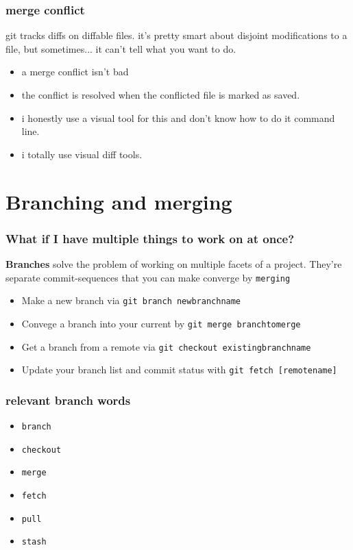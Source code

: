 \documentclass[14pt,aspectratio=1610]{beamer} %
\newcommand{\fframe}[2]{
   \begin{frame}
\frametitle{#1}
#2
\end{frame}
}
\begin{document}
\fframe{merge conflict}
{
	git tracks diffs on diffable files.  it's pretty smart about disjoint modifications to a file, but sometimes... it can't tell what you want to do.

		\begin{itemize}
	\item a merge conflict isn't bad
	\item the conflict is resolved when the conflicted file is marked as saved.  
	\item i honestly use a visual tool for this and don't know how to do it command line.  
	\item i totally use visual diff tools.  
\end{itemize}
}






\section{Branching and merging}

\fframe{What if I have multiple things to work on at once?}
{
	{\bf Branches} solve the problem of working on multiple facets of a project.  They're separate commit-sequences that you can make converge by {\tt merging}

	\vspace{\baselineskip}

	\begin{itemize}
		\item Make a new branch via {\tt git branch newbranchname}
		\item Convege a branch into your current by {\tt git merge branchtomerge}
		\item Get a branch from a remote via {\tt git checkout existingbranchname}
		\item Update your branch list and commit status with {\tt git fetch [remotename]}
	\end{itemize}

}


\fframe{relevant branch words}
{
	 \begin{itemize}
		\item {\tt branch}
		\item {\tt checkout}
		\item {\tt merge}
		\item {\tt fetch}
		\item {\tt pull}
		\item {\tt stash}
	\end{itemize}
}
\end{document}
